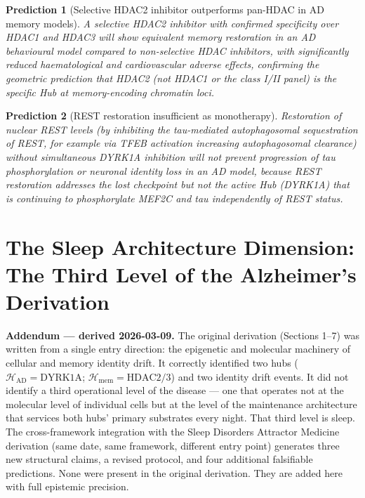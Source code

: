 \documentclass[12pt,a4paper]{article}
\newenvironment{warnenv}{%
  \begin{tcolorbox}[colback=red!5,colframe=warnbox,boxrule=1pt,
    arc=3pt,left=8pt,right=8pt,top=6pt,bottom=6pt,breakable]}{%
  \end{tcolorbox}}
\newtheorem{prediction}{Prediction}
\begin{document}
\begin{prediction}[Selective HDAC2 inhibitor
outperforms pan-HDAC in AD memory models]
\label{pred:selective}
A selective HDAC2 inhibitor with confirmed specificity
over HDAC1 and HDAC3 will show equivalent memory
restoration in an AD behavioural model compared
to non-selective HDAC inhibitors, with significantly
reduced haematological and cardiovascular adverse
effects, confirming the geometric prediction that
HDAC2 (not HDAC1 or the class I/II panel) is the
specific Hub at memory-encoding chromatin loci.
\end{prediction}

\begin{prediction}[REST restoration insufficient
as monotherapy]
\label{pred:rest}
Restoration of nuclear REST levels (by inhibiting
the tau-mediated autophagosomal sequestration of REST,
for example via TFEB activation increasing
autophagosomal clearance) without simultaneous DYRK1A
inhibition will not prevent progression of tau
phosphorylation or neuronal identity loss in an AD
model, because REST restoration addresses the lost
checkpoint but not the active Hub (DYRK1A) that
is continuing to phosphorylate MEF2C and tau
independently of REST status.
\end{prediction}

\section{The Sleep Architecture Dimension:
The Third Level of the Alzheimer's Derivation}
\label{sec:sleep}

\begin{warnenv}
\textbf{Addendum --- derived 2026-03-09.}
The original derivation (Sections 1--7) was written
from a single entry direction: the epigenetic and
molecular machinery of cellular and memory identity
drift. It correctly identified two hubs
($\mathcal{H}_{\mathrm{AD}} = \text{DYRK1A}$;
$\mathcal{H}_{\mathrm{mem}} = \text{HDAC2/3}$) and
two identity drift events. It did not identify a
third operational level of the disease --- one that
operates not at the molecular level of individual
cells but at the level of the maintenance architecture
that services both hubs' primary substrates every
night. That third level is sleep. The cross-framework
integration with the Sleep Disorders Attractor
Medicine derivation (same date, same framework,
different entry point) generates three new structural
claims, a revised protocol, and four additional
falsifiable predictions. None were present in the
original derivation. They are added here with full
epistemic precision.
\end{warnenv}
\end{document}

